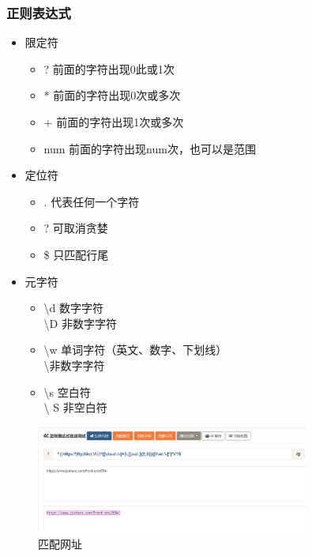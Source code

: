 \documentclass[a4paper,12pt]{article}
\begin{document}
\subsubsection{\color{green}正则表达式}
\begin{itemize}
    \item 限定符
        \begin{itemize}
                \item ? 前面的字符出现0此或1次
                \item * 前面的字符出现0次或多次
                \item + 前面的字符出现1次或多次
                \item {num} 前面的字符出现num次，也可以是范围
        \end{itemize}

    \item 定位符
        \begin{itemize}
            \item . 代表任何一个字符
            \item ? 可取消贪婪
            \item \$ 只匹配行尾
        \end{itemize}
    \item 元字符
        \begin{itemize}
            \item \textbackslash{}d 数字字符\\ \textbackslash{}D 非数字字符 
            \item \textbackslash{}w 单词字符（英文、数字、下划线）\\ \textbackslash{}非数字字符
            \item \textbackslash{}s 空白符\\ \textbackslash{} S 非空白符
        \end{itemize}
\end{itemize}

\begin{figure}[h]
    \centering
    \includegraphics[width=0.8\textwidth]{RegEx.png}
    \caption{匹配网址}

    
\end{figure}
\end{document}
